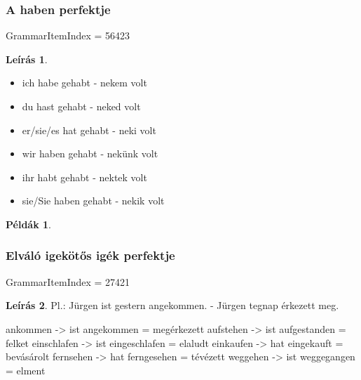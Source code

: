 \documentclass{article}
\theoremstyle{definition}
\newtheorem*{exmp}{Példák}
\newtheorem*{desc}{Leírás}
\begin{document}
\subsubsection{A haben perfektje}

GrammarItemIndex = 56423

\begin{desc}
\begin{itemize}
\item ich habe gehabt - nekem volt
\item du hast gehabt - neked volt
\item er/sie/es hat gehabt - neki volt
\item wir haben gehabt - nekünk volt
\item ihr habt gehabt - nektek volt
\item sie/Sie haben gehabt - nekik volt
\end{itemize}
\end{desc}

\begin{exmp}
\end{exmp}

\subsubsection{Elváló igekötős igék perfektje}

GrammarItemIndex = 27421

\begin{desc}
Pl.: Jürgen ist gestern angekommen. - Jürgen tegnap érkezett meg.

ankommen -> ist angekommen = megérkezett
aufstehen -> ist aufgestanden = felket
einschlafen -> ist eingeschlafen = elaludt
einkaufen -> hat eingekauft = bevásárolt
fernsehen -> hat ferngesehen = tévézett
weggehen -> ist weggegangen = elment
\end{desc}
\end{document}
